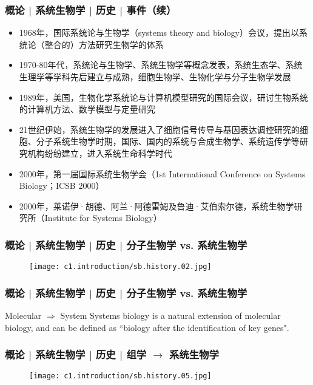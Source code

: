 \begin{frame}
  \frametitle{概论 | 系统生物学 | 历史 | 事件（续）}
  \begin{itemize}
    \item 1968年，国际系统论与生物学（systems theory and biology）会议，提出以系统论（整合的）方法研究生物学的体系
    \item 1970-80年代，系统论与生物学、系统生物学等概念发表，系统生态学、系统生理学等学科先后建立与成熟，细胞生物学、生物化学与分子生物学发展
    \item 1989年，美国，生物化学系统论与计算机模型研究的国际会议，研讨生物系统的计算机方法、数学模型与定量研究
    \item 21世纪伊始，系统生物学的发展进入了细胞信号传导与基因表达调控研究的细胞、分子系统生物学时期，国际、国内的系统与合成生物学、系统遗传学等研究机构纷纷建立，进入系统生命科学时代
    \item 2000年，第一届国际系统生物学会（1st International Conference on Systems Biology；ICSB 2000）
    \item 2000年，莱诺伊·胡德、阿兰·阿德雷姆及鲁迪·艾伯索尔德，系统生物学研究所（Institute for Systems Biology）
  \end{itemize}
\end{frame}

\begin{frame}
  \frametitle{概论 | 系统生物学 | 历史 | 分子生物学 vs. 系统生物学}
  \begin{figure}
    \centering
    \texttt{[image: c1.introduction/sb.history.02.jpg]}
  \end{figure}
\end{frame}

\begin{frame}
  \frametitle{概论 | 系统生物学 | 历史 | 分子生物学 vs. 系统生物学}
  \begin{block}{Molecular $\Rightarrow$ System}
  Systems biology is a natural extension of molecular biology, and can be defined as ``biology after the identification of key genes".
  \end{block}
\end{frame}

\begin{frame}
  \frametitle{概论 | 系统生物学 | 历史 | 组学 $\rightarrow$ 系统生物学}
  \begin{figure}
    \centering
    \texttt{[image: c1.introduction/sb.history.05.jpg]}
  \end{figure}
\end{frame}

